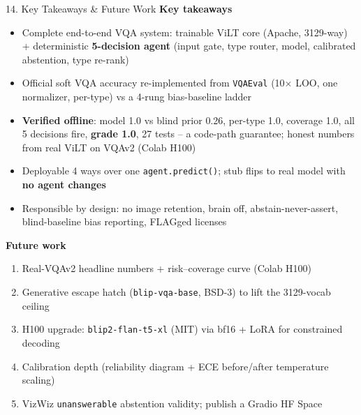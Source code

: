 \documentclass[10pt,aspectratio=169]{beamer}
\begin{document}
\begin{frame}{14. Key Takeaways \& Future Work}
\textbf{Key takeaways}
\begin{itemize}\small
  \item Complete end-to-end VQA system: trainable ViLT core (Apache, 3129-way) + deterministic \textbf{5-decision agent} (input gate, type router, model, calibrated abstention, type re-rank)
  \item Official soft VQA accuracy re-implemented from \texttt{VQAEval} (10$\times$ LOO, one normalizer, per-type) vs a 4-rung bias-baseline ladder
  \item \textbf{Verified offline}: model 1.0 vs blind prior 0.26, per-type 1.0, coverage 1.0, all 5 decisions fire, \textbf{grade 1.0}, 27 tests -- a code-path guarantee; honest numbers from real ViLT on VQAv2 (Colab H100)
  \item Deployable 4 ways over one \texttt{agent.predict()}; stub flips to real model with \textbf{no agent changes}
  \item Responsible by design: no image retention, brain off, abstain-never-assert, blind-baseline bias reporting, FLAGged licenses
\end{itemize}

\textbf{Future work}
\begin{enumerate}\small
  \item Real-VQAv2 headline numbers + risk--coverage curve (Colab H100)
  \item Generative escape hatch (\texttt{blip-vqa-base}, BSD-3) to lift the 3129-vocab ceiling
  \item H100 upgrade: \texttt{blip2-flan-t5-xl} (MIT) via bf16 + LoRA for constrained decoding
  \item Calibration depth (reliability diagram + ECE before/after temperature scaling)
  \item VizWiz \texttt{unanswerable} abstention validity; publish a Gradio HF Space
\end{enumerate}
\end{frame}
\end{document}
